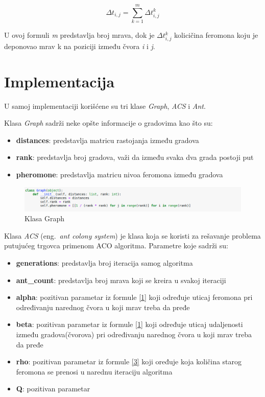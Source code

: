 \documentclass[a4paper]{article}
\begin{document}
\begin{equation}\label{4}
\Delta t_{i,j}  = \sum_{k=1}^{m} \Delta t^k_{i,j}
\end{equation}

U ovoj formuli \textit{m} predstavlja broj mrava, dok je $\Delta t^k_{i,j}$ kolicičina feromona koju je deponovao mrav k na poziciji između čvora \textit{i} i \textit{j}.

\section{Implementacija}
\label{sec:naslov1}

U samoj implementaciji korišćene su tri klase \textit{Graph}, \textit{ACS} i \textit{Ant}. 

Klasa \textit{Graph} sadrži neke opšte informacije o gradovima kao što su:
\begin{itemize}
  \item \textbf{distances}: predstavlja matricu rastojanja između gradova
  \item \textbf{rank}: predstavlja broj gradova, važi da između svaka dva grada postoji put
  \item \textbf{pheromone}: predstavlja matricu nivoa feromona između gradova 
\end{itemize}

\begin{figure}[h!]
\begin{center}
\includegraphics[width=1\columnwidth]{slika1.png}
\end{center}
\caption{Klasa Graph}
\label{fig:slika1}
\end{figure}

Klasa \textit{ACS} (eng.~{\em ant colony system}) je klasa koja se koristi za rešavanje problema putujućeg trgovca primenom ACO algoritma. Parametre koje sadrži su:

\begin{itemize}
	\item \textbf{generations}: predstavlja broj iteracija samog algoritma
	\item \textbf{ant\_count}: predstavlja broj mrava koji se kreira u svakoj iteraciji
	\item \textbf{alpha}: pozitivan parametar iz formule \ref{1} koji određuje uticaj feromona pri određivanju narednog čvora u koji mrav treba da pređe
	\item \textbf{beta}: pozitivan parametar iz formule \ref{1} koji određuje uticaj udaljenosti između gradova(čvorova) pri određivanju narednog čvora u koji mrav treba da pređe
	\item \textbf{rho}: pozitivan parametar iz formule \ref{3} koji oređuje koja količina starog feromona se prenosi u narednu iteraciju algoritma
	\item \textbf{Q}: pozitivan parametar
		
\end{itemize}
\end{document}
